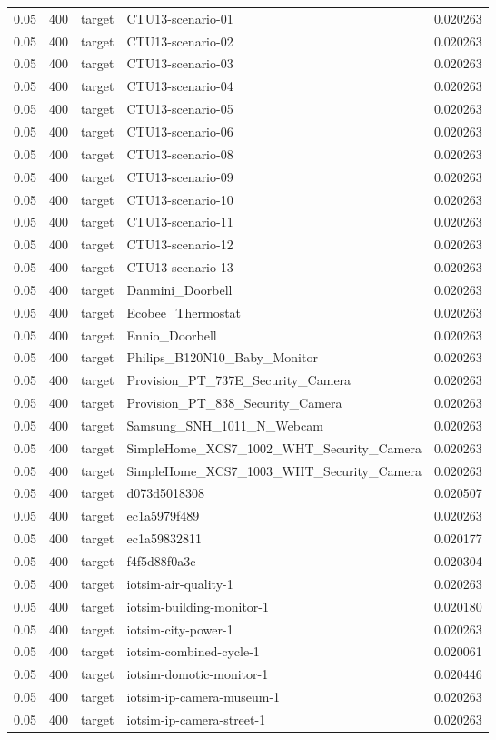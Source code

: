 \begin{tabular}{lllll}
0.05 & 400 & target & CTU13-scenario-01 & 0.020263 \\
0.05 & 400 & target & CTU13-scenario-02 & 0.020263 \\
0.05 & 400 & target & CTU13-scenario-03 & 0.020263 \\
0.05 & 400 & target & CTU13-scenario-04 & 0.020263 \\
0.05 & 400 & target & CTU13-scenario-05 & 0.020263 \\
0.05 & 400 & target & CTU13-scenario-06 & 0.020263 \\
0.05 & 400 & target & CTU13-scenario-08 & 0.020263 \\
0.05 & 400 & target & CTU13-scenario-09 & 0.020263 \\
0.05 & 400 & target & CTU13-scenario-10 & 0.020263 \\
0.05 & 400 & target & CTU13-scenario-11 & 0.020263 \\
0.05 & 400 & target & CTU13-scenario-12 & 0.020263 \\
0.05 & 400 & target & CTU13-scenario-13 & 0.020263 \\
0.05 & 400 & target & Danmini\_Doorbell & 0.020263 \\
0.05 & 400 & target & Ecobee\_Thermostat & 0.020263 \\
0.05 & 400 & target & Ennio\_Doorbell & 0.020263 \\
0.05 & 400 & target & Philips\_B120N10\_Baby\_Monitor & 0.020263 \\
0.05 & 400 & target & Provision\_PT\_737E\_Security\_Camera & 0.020263 \\
0.05 & 400 & target & Provision\_PT\_838\_Security\_Camera & 0.020263 \\
0.05 & 400 & target & Samsung\_SNH\_1011\_N\_Webcam & 0.020263 \\
0.05 & 400 & target & SimpleHome\_XCS7\_1002\_WHT\_Security\_Camera & 0.020263 \\
0.05 & 400 & target & SimpleHome\_XCS7\_1003\_WHT\_Security\_Camera & 0.020263 \\
0.05 & 400 & target & d073d5018308 & 0.020507 \\
0.05 & 400 & target & ec1a5979f489 & 0.020263 \\
0.05 & 400 & target & ec1a59832811 & 0.020177 \\
0.05 & 400 & target & f4f5d88f0a3c & 0.020304 \\
0.05 & 400 & target & iotsim-air-quality-1 & 0.020263 \\
0.05 & 400 & target & iotsim-building-monitor-1 & 0.020180 \\
0.05 & 400 & target & iotsim-city-power-1 & 0.020263 \\
0.05 & 400 & target & iotsim-combined-cycle-1 & 0.020061 \\
0.05 & 400 & target & iotsim-domotic-monitor-1 & 0.020446 \\
0.05 & 400 & target & iotsim-ip-camera-museum-1 & 0.020263 \\
0.05 & 400 & target & iotsim-ip-camera-street-1 & 0.020263 \\
\bottomrule
\end{tabular}
